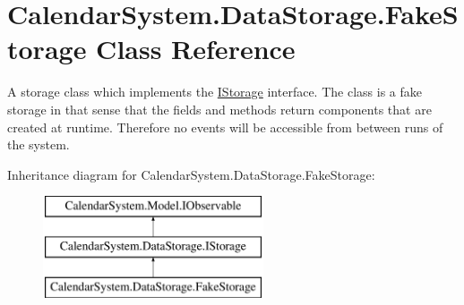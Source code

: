 \hypertarget{class_calendar_system_1_1_data_storage_1_1_fake_storage}{\section{Calendar\+System.\+Data\+Storage.\+Fake\+Storage Class Reference}
\label{class_calendar_system_1_1_data_storage_1_1_fake_storage}
}


A storage class which implements the \hyperlink{interface_calendar_system_1_1_data_storage_1_1_i_storage}{I\+Storage} interface. The class is a fake storage in that sense that the fields and methods return components that are created at runtime. Therefore no events will be accessible from between runs of the system.  


Inheritance diagram for Calendar\+System.\+Data\+Storage.\+Fake\+Storage\+:\begin{figure}[H]
\begin{center}
\leavevmode
\includegraphics[height=3.000000cm]{class_calendar_system_1_1_data_storage_1_1_fake_storage}
\end{center}
\end{figure}
